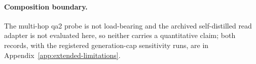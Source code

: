 \paragraph{Composition boundary.}
The multi-hop qa2 probe is not load-bearing and the archived self-distilled read
adapter is not evaluated here, so neither carries a quantitative claim; both
records, with the registered generation-cap sensitivity runs, are in
Appendix~\ref{app:extended-limitations}.

